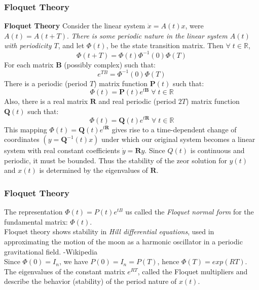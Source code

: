 \documentclass[11pt,handout]{beamer}   %
\begin{document}
\begin{frame}
\frametitle{Floquet Theory}
\footnotesize
\textbf{Floquet Theory} 
Consider the linear system $\dot{x} = A(t) x$, were $A(t) = A(t+T)$. \textit{There is some periodic nature in the linear system $A(t)$ with periodicity $T$}, and let $\Phi(t)$, be the state transition matrix. Then $\forall \; t \in \mathbb{R}$,
\begin{equation*}
\Phi(t+T) = \Phi(t)\Phi^{-1}(0)\Phi(T)
\end{equation*}
For each matrix $\mathbf{B}$ (possibly complex) such that:
\begin{equation*}
e^{T B} = \Phi^{-1}(0)\Phi(T)
\end{equation*}
There is a periodic (period $T$) matrix function $ \mathbf{P}(t)$ such that:
\begin{equation*}
\Phi(t) = \mathbf{P}(t)e^{t\mathbf{B}} \; \forall \; t \in \mathbb{R}
\end{equation*}
Also, there is a real matrix $\mathbf{R}$ and real periodic (period $2T$) matrix function $\mathbf{Q}(t)$ such that:
\begin{equation*}
\Phi(t) = \mathbf{Q}(t) e^{t \mathbf{R}} \; \forall \; t \in \mathbb{R}
\end{equation*}
This mapping $\Phi(t) = \mathbf{Q}(t)e^{t\mathbf{R}}$ gives rise to a time-dependent change of coordinates $(y=\mathbf{Q}^{-1}(t)x)$ under which our original system becomes a linear system with real constant coefficients $\dot{y} = \mathbf{R}y$. Since $Q(t)$ is continuous and periodic, it must be bounded. Thus the stability of the zeor solution for $y(t)$ and $x(t)$ is determined by the eigenvalues of $\mathbf{R}$.

\end{frame}


\begin{frame}
\frametitle{Floquet Theory}
\small
The representation $\Phi(t) = P(t)e^{tB}$ us called the \textit{Floquet normal form} for the fundamental matrix: $\Phi(t)$.\\
\vspace{6pt}
Floquet theory shows stability in \textit{Hill differential equations}, used in approximating the motion of the moon as a harmonic oscillator in a periodic gravitational field. -Wikipedia\\
Since $\Phi(0) = I_n$, we have $P(0) = I_n = P(T)$, hence $\Phi(T) = exp(RT)$.\\
\vspace{6pt}
The eigenvalues of the constant matrix $e^{RT}$, called the Floquet multipliers and describe the behavior (stability) of the period nature of $x(t)$.\\
\end{frame}
\end{document}

